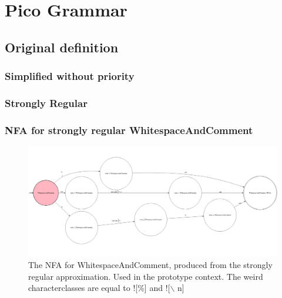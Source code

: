 
\chapter{Pico Grammar} %

\label{app:pico} %

\section{Original definition} \label{app:pico:default}


\subsection{Simplified without priority} \label{app:picosimple}


\subsection{Strongly Regular} \label{app:pico:stronglyregular}



\pagebreak\subsection{NFA for strongly regular WhitespaceAndComment}
\begin{figure}[h!]
	\centering
	\includegraphics[width=\textwidth, keepaspectratio]{Figures/pico_nfa_whitespaceandcomment.png}
	\decoRule
 	\caption[NFA of WhitespaceAndComment]{The NFA for WhitespaceAndComment, produced from the strongly regular approximation. Used in the prototype context. The weird characterclasses are equal to ![\%] and ![$\backslash$ n]}
 	\label{fig:pico:NFA:WhitespaceAndComment}
\end{figure}


